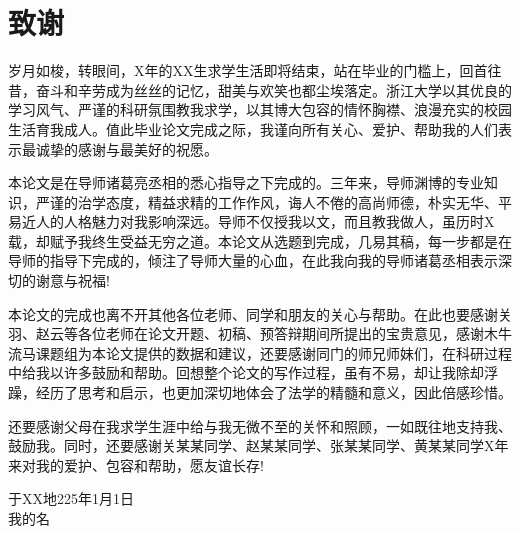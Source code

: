 \chapter{致谢}
岁月如梭，转眼间，X年的XX生求学生活即将结束，站在毕业的门槛上，回首往昔，奋斗和辛劳成为丝丝的记忆，甜美与欢笑也都尘埃落定。浙江大学以其优良的学习风气、严谨的科研氛围教我求学，以其博大包容的情怀胸襟、浪漫充实的校园生活育我成人。值此毕业论文完成之际，我谨向所有关心、爱护、帮助我的人们表示最诚挚的感谢与最美好的祝愿。

本论文是在导师诸葛亮丞相的悉心指导之下完成的。三年来，导师渊博的专业知识，严谨的治学态度，精益求精的工作作风，诲人不倦的高尚师德，朴实无华、平易近人的人格魅力对我影响深远。导师不仅授我以文，而且教我做人，虽历时X载，却赋予我终生受益无穷之道。本论文从选题到完成，几易其稿，每一步都是在导师的指导下完成的，倾注了导师大量的心血，在此我向我的导师诸葛丞相表示深切的谢意与祝福!

本论文的完成也离不开其他各位老师、同学和朋友的关心与帮助。在此也要感谢关羽、赵云等各位老师在论文开题、初稿、预答辩期间所提出的宝贵意见，感谢木牛流马课题组为本论文提供的数据和建议，还要感谢同门的师兄师妹们，在科研过程中给我以许多鼓励和帮助。回想整个论文的写作过程，虽有不易，却让我除却浮躁，经历了思考和启示，也更加深切地体会了法学的精髓和意义，因此倍感珍惜。

还要感谢父母在我求学生涯中给与我无微不至的关怀和照顾，一如既往地支持我、鼓励我。同时，还要感谢关某某同学、赵某某同学、张某某同学、黄某某同学X年来对我的爱护、包容和帮助，愿友谊长存!

\vspace{2cm}
\hfill
\begin{minipage}{14em}
\begin{center}
于XX地\quad 225年1月1日\\
我的名
\end{center}
\end{minipage}
